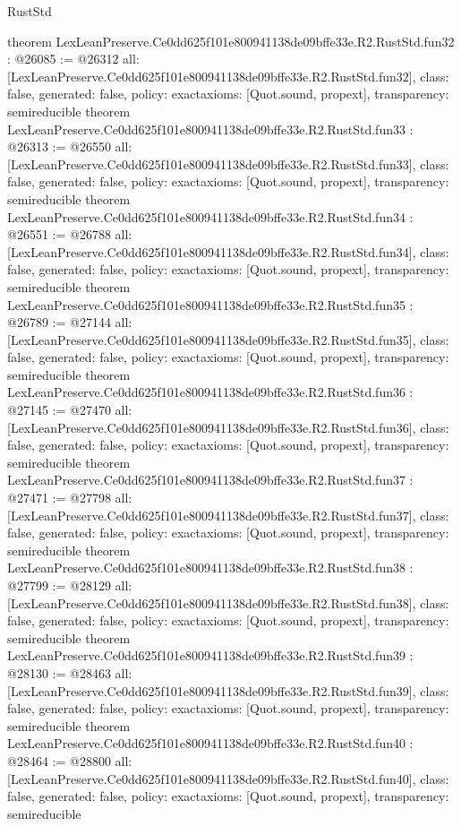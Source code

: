 \begin{lexlean}{RustStd}
\begin{coremodule}
{}
theorem LexLeanPreserve.Ce0dd625f101e800941138de09bffe33e.R2.RustStd.fun32 : @26085 := @26312 {
  all: [LexLeanPreserve.Ce0dd625f101e800941138de09bffe33e.R2.RustStd.fun32],
  class: false,
  generated: false,
  policy: exact{axioms: [Quot.sound, propext]},
  transparency: semireducible
}
theorem LexLeanPreserve.Ce0dd625f101e800941138de09bffe33e.R2.RustStd.fun33 : @26313 := @26550 {
  all: [LexLeanPreserve.Ce0dd625f101e800941138de09bffe33e.R2.RustStd.fun33],
  class: false,
  generated: false,
  policy: exact{axioms: [Quot.sound, propext]},
  transparency: semireducible
}
theorem LexLeanPreserve.Ce0dd625f101e800941138de09bffe33e.R2.RustStd.fun34 : @26551 := @26788 {
  all: [LexLeanPreserve.Ce0dd625f101e800941138de09bffe33e.R2.RustStd.fun34],
  class: false,
  generated: false,
  policy: exact{axioms: [Quot.sound, propext]},
  transparency: semireducible
}
theorem LexLeanPreserve.Ce0dd625f101e800941138de09bffe33e.R2.RustStd.fun35 : @26789 := @27144 {
  all: [LexLeanPreserve.Ce0dd625f101e800941138de09bffe33e.R2.RustStd.fun35],
  class: false,
  generated: false,
  policy: exact{axioms: [Quot.sound, propext]},
  transparency: semireducible
}
theorem LexLeanPreserve.Ce0dd625f101e800941138de09bffe33e.R2.RustStd.fun36 : @27145 := @27470 {
  all: [LexLeanPreserve.Ce0dd625f101e800941138de09bffe33e.R2.RustStd.fun36],
  class: false,
  generated: false,
  policy: exact{axioms: [Quot.sound, propext]},
  transparency: semireducible
}
theorem LexLeanPreserve.Ce0dd625f101e800941138de09bffe33e.R2.RustStd.fun37 : @27471 := @27798 {
  all: [LexLeanPreserve.Ce0dd625f101e800941138de09bffe33e.R2.RustStd.fun37],
  class: false,
  generated: false,
  policy: exact{axioms: [Quot.sound, propext]},
  transparency: semireducible
}
theorem LexLeanPreserve.Ce0dd625f101e800941138de09bffe33e.R2.RustStd.fun38 : @27799 := @28129 {
  all: [LexLeanPreserve.Ce0dd625f101e800941138de09bffe33e.R2.RustStd.fun38],
  class: false,
  generated: false,
  policy: exact{axioms: [Quot.sound, propext]},
  transparency: semireducible
}
theorem LexLeanPreserve.Ce0dd625f101e800941138de09bffe33e.R2.RustStd.fun39 : @28130 := @28463 {
  all: [LexLeanPreserve.Ce0dd625f101e800941138de09bffe33e.R2.RustStd.fun39],
  class: false,
  generated: false,
  policy: exact{axioms: [Quot.sound, propext]},
  transparency: semireducible
}
theorem LexLeanPreserve.Ce0dd625f101e800941138de09bffe33e.R2.RustStd.fun40 : @28464 := @28800 {
  all: [LexLeanPreserve.Ce0dd625f101e800941138de09bffe33e.R2.RustStd.fun40],
  class: false,
  generated: false,
  policy: exact{axioms: [Quot.sound, propext]},
  transparency: semireducible
}
\end{coremodule}
\end{lexlean}

